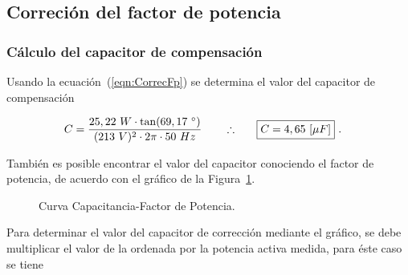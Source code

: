   \subsection{Correción del factor de potencia}
    \subsubsection{Cálculo del capacitor de compensación}
      
       Usando la ecuación~(\ref{eqn:CorrecFp}) se determina el valor del capacitor de compensación

      \begin{align*}
        C = \frac{25,22~W \cdot \tan(69,17~^{\circ} )}{(213~V)^2 \cdot 2  \pi \cdot 50~Hz }  \hspace{20pt} \therefore \hspace{20pt} \Aboxed{C = 4,65~[\mu F]}~.
      \end{align*}

        También es posible encontrar el valor del capacitor conociendo el factor de potencia, de acuerdo
        con el gráfico de la Figura~\ref{fig: Curva Cap_FDP}. 

        \begin{figure}[H]
          \centering
            \caption{Curva Capacitancia-Factor de Potencia.}
            \label{fig: Curva Cap_FDP}
        \end{figure}

        Para determinar el valor del capacitor de corrección mediante el gráfico, se debe 
        multiplicar el valor de la ordenada por la potencia activa medida, para éste caso 
        se tiene 

